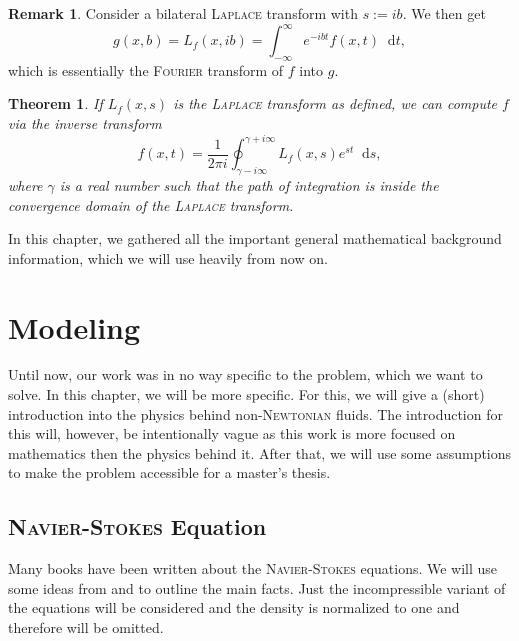 \documentclass[12pt,a4paper,twoside, open=right]{scrreprt}
\theoremstyle{definition}
\newtheorem{rem}[auf]{Remark}
\theoremstyle{plain}
\newtheorem{sa}[auf]{Theorem}
\newcommand{\D}{\mathop{}\!\mathrm{d}}
\begin{document}
\begin{rem}
    Consider a bilateral \textsc{Laplace} transform with $s:=ib$. We then get
    \begin{equation}
        g(x,b)=L_f(x,ib)=\int_{-\infty}^\infty e^{-ibt}f(x,t)\D t,
    \end{equation}
    which is essentially the \textsc{Fourier} transform of $f$ into $g$.
\end{rem}
\begin{sa}
    If $L_f(x,s) $ is the \textsc{Laplace} transform as defined, we can compute $f$ via the inverse transform
    \begin{equation}
        f(x,t) = \frac{1}{2\pi i}\oint_{\gamma-i\infty}^{\gamma +i\infty}L_f(x,s)e^{st}\D s,
    \end{equation}
    where $\gamma$ is a real number such that the path of integration is inside the convergence domain of the \textsc{Laplace} transform.
\end{sa}
In this chapter, we gathered all the important general mathematical background information, which we will use heavily from now on. 
\chapter{Modeling}
\label{ch:model}
Until now, our work was in no way specific to the problem, which we want to solve. In this chapter, we will be more specific. For this, we will give a (short) introduction into the physics behind non-\textsc{Newtonian} fluids. The introduction for this will, however, be intentionally vague as this work is more focused on mathematics then the physics behind it. After that, we will use some assumptions to make the problem accessible for a master's thesis.
\section{\textsc{Navier-Stokes} Equation}
Many books have been written about the \textsc{Navier-Stokes} equations. We will use some ideas from \cite{Lukaszewicz2016} and \cite{White2006} to outline the main facts. Just the incompressible variant of the equations will be considered and the density is normalized to one and therefore will be omitted.
\end{document}
